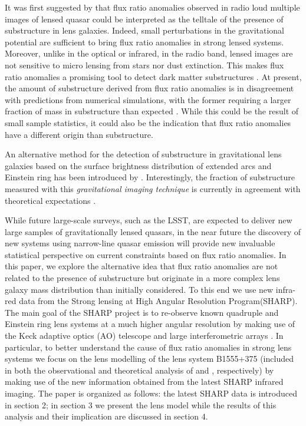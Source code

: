 \documentclass[useAMS,usenatbib]{mn2e}
\begin{document}
It was first suggested by \citet{Mao1998} that flux ratio anomalies observed in radio loud multiple images of lensed quasar could be interpreted as the telltale of the presence of substructure in lens galaxies.
Indeed, small perturbations in the gravitational potential are
sufficient to bring flux ratio anomalies in strong lensed systems.
Moreover, unlike in the optical or infrared, in the radio band, lensed
images are not sensitive to micro lensing from stars nor dust
extinction.  This makes flux ratio anomalies a promising tool to
detect dark matter substructures \citep{Dalal2002, N13}.  At present,
the amount of substructure derived from flux ratio anomalies is in
disagreement with predictions from numerical simulations, with the
former requiring a larger fraction of mass in substructure than
expected \citet{Xu14}. While this could be the result of small sample
statistics, it could also be the indication that flux ratio anomalies
have a different origin than substructure. 

An alternative method for
the detection of substructure in gravitational lens galaxies based on
the surface brightness distribution of extended arcs and Einstein ring
has been introduced by \citet{K05,V09}. Interestingly, the fraction of
substructure measured with this \emph{gravitational imaging technique}
is currently in agreement with theoretical expectations \citep{V14a}.

While future large-scale surveys, such as the LSST, are expected to
deliver new large samples of gravitationally lensed quasars, in the
near future the discovery of new systems using narrow-line quasar
emission \citep{N14} will provide new invaluable statistical
perspective on current constraints based on flux ratio anomalies.  In
this paper, we explore the alternative idea that flux ratio anomalies
are not related to the presence of substructure but originate in a
more complex lens galaxy mass distribution than initially
considered. To this end we use new infra-red data from the Strong
lensing at High Angular Resolution Program(SHARP). The main goal of
the SHARP project is to re-observe known quadruple and Einstein ring
lens systems at a much higher angular resolution by making use of the
Keck adaptive optics (AO) telescope and large interferometric arrays
\citep{SHARP12,V12} . In particular, to better understand the cause of
flux ratio anomalies in strong lens systems we focus on the lens
modelling of the lens system B1555+375 (included in both the
observational and theoretical analysis of \citet{Dalal2002} and
\citet{Xu14}, respectively) by making use of the new information
obtained from the latest SHARP infrared imaging. The paper is
organized as follows: the latest SHARP data is introduced in section
2; in section 3 we present the lens model while the results of this
analysis and their implication are discussed in section 4.
\end{document}

